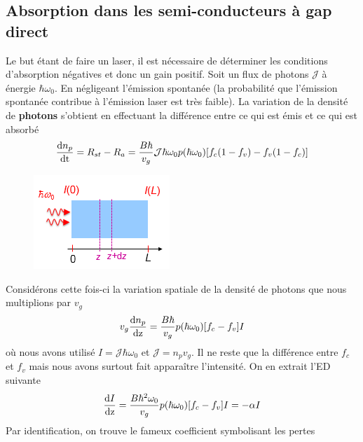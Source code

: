 	\subsection{Absorption dans les semi-conducteurs à gap direct}
	Le but étant de faire un laser, il est nécessaire de déterminer les conditions d'absorption
	négatives et donc un gain positif. Soit un flux de photons $\mathcal{J}$ à énergie $\hbar	
	\omega_0$. En négligeant l'émission spontanée (la probabilité que l'émission spontanée contribue à
	l'émission laser est très faible). La variation de la densité de \textbf{photons} s'obtient en
	effectuant la différence entre ce qui est émis et ce qui est absorbé
	\begin{equation}
	\frac{{{\rm{d}}{n_p}}}{{{\rm{dt}}}} = {R_{st}} - {R_a} = \frac{{B\hbar }}{{{v_g}}}{{\cal J}}
	\hbar {\omega _0}p(\hbar {\omega _0})[{f_c}(1 - {f_v}) - {f_v}(1 - {f_c})]
	\end{equation}
	\begin{figure}
	\vspace{-6mm}
	\includegraphics[scale=0.9]{ch5/image21}
	\end{figure}
	Considérons cette fois-ci la variation spatiale de la densité de photons que nous multiplions 
	par $v_g$
	\begin{equation}
	{v_g}\frac{{{\rm{d}}{n_p}}}{{{\rm{dz}}}} = \frac{{B\hbar }}{{{v_g}}}p(\hbar {\omega _0})[{f_c} -
	 {f_v}]I
	\end{equation}
	où nous avons utilisé $I = \mathcal{J}\hbar\omega_0$ et $\mathcal{J} = n_pv_g$. Il ne reste 
	que la différence entre $f_c$ et $f_v$ mais nous avons surtout fait apparaître l'intensité. On en
	extrait l'ED suivante
	\begin{equation}
	\frac{{{\rm{d}}I}}{{{\rm{dz}}}} = \frac{{B{\hbar ^2}{\omega _0}}}{{{v_g}}}p(\hbar {\omega _0})
	[{f_c} - {f_v}]I =  - \alpha I
	\end{equation}
	Par identification, on trouve le fameux coefficient symbolisant les pertes\\
	
	\ \\
	
